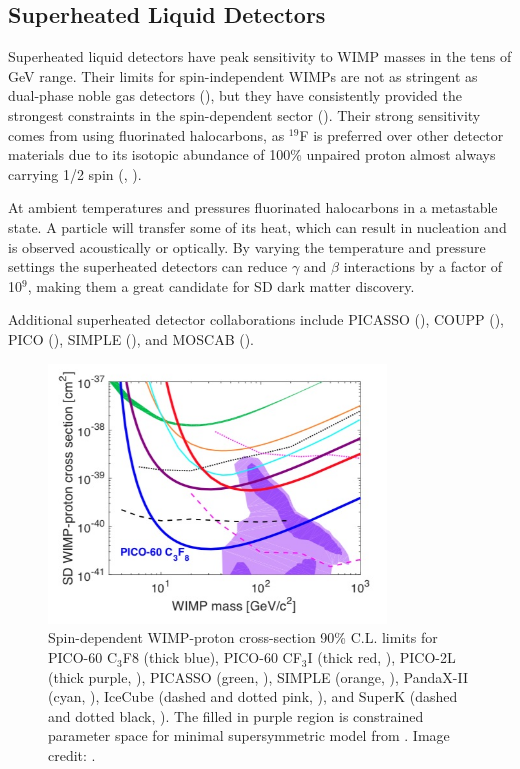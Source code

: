 \subsection{Superheated Liquid Detectors} \label{subsubsec:bubbles}
Superheated liquid detectors have peak sensitivity to WIMP masses in the tens of GeV range.  Their limits for spin-independent
WIMPs are not as stringent as dual-phase noble gas detectors (), but they have consistently provided the
strongest constraints in the spin-dependent sector ().  Their strong sensitivity comes from using fluorinated
halocarbons, as $^{19}$F is preferred over other detector materials due to its isotopic abundance of 100\% unpaired proton
almost always carrying 1/2 spin (, ).

At ambient temperatures and pressures fluorinated halocarbons in a metastable state.  A particle will transfer some of its heat,
which can result in nucleation and is observed acoustically or optically.  By varying the temperature and pressure settings
the superheated detectors can reduce $\gamma$ and $\beta$ interactions by a factor of 10$^{9}$, making them a great candidate for
SD dark matter discovery.

Additional superheated detector collaborations include PICASSO (), COUPP (),
PICO (), SIMPLE (), and MOSCAB ().


\begin{figure}
 \centering
 \includegraphics[width=0.8\textwidth]{spin_dependent_limits}
 \caption{Spin-dependent WIMP-proton cross-section 90\% C.L. limits for PICO-60 C$_{3}$F${8}$ (thick blue), PICO-60 CF$_{3}$I (thick red,
 ), PICO-2L (thick purple, ), PICASSO (green, ), SIMPLE (orange,
 ), PandaX-II (cyan, ), IceCube (dashed and dotted pink, ), and SuperK (dashed and
 dotted black, ).  The filled in purple region is constrained parameter space for minimal
 supersymmetric model from .
 Image credit: .}
 \label{fig:sd_limits}
\end{figure}

